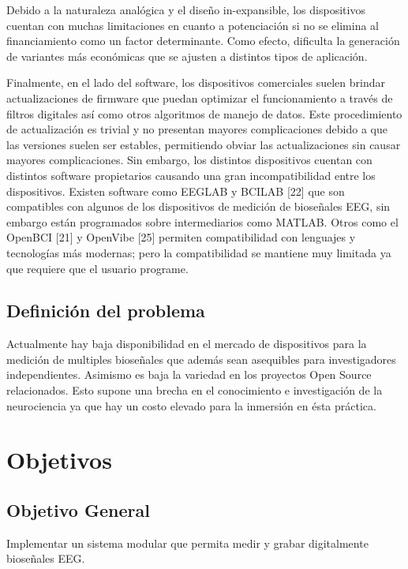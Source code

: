Debido a la naturaleza analógica y el diseño in-expansible, los dispositivos cuentan con muchas limitaciones en cuanto a potenciación si no se elimina al financiamiento como un factor determinante. Como efecto, dificulta la generación de variantes más económicas que se ajusten a distintos tipos de aplicación.

Finalmente, en el lado del software, los dispositivos comerciales suelen brindar actualizaciones de firmware que puedan optimizar el funcionamiento a través de filtros digitales así como otros algoritmos de manejo de datos. Este procedimiento de actualización es trivial y no presentan mayores complicaciones debido a que las versiones suelen ser estables, permitiendo obviar las actualizaciones sin causar mayores complicaciones. Sin embargo, los distintos dispositivos cuentan con distintos software propietarios causando una gran incompatibilidad entre los dispositivos. Existen software como EEGLAB y BCILAB [22] que son compatibles con algunos de los dispositivos de medición de bioseñales EEG, sin embargo están programados sobre intermediarios como MATLAB. Otros como el OpenBCI [21] y OpenVibe [25] permiten compatibilidad con lenguajes y tecnologías más modernas; pero la compatibilidad se mantiene muy limitada ya que requiere que el usuario programe.

\subsection{Definición del problema}
\label{sec:org88e0b95}
Actualmente hay baja disponibilidad en el mercado de dispositivos para la medición de multiples bioseñales que además sean asequibles para investigadores independientes. Asimismo es baja la variedad en los proyectos Open Source relacionados. Esto supone una brecha en el conocimiento e investigación de la neurociencia ya que hay un costo elevado para la inmersión en ésta práctica.

\section{Objetivos}
\label{sec:org3643799}
\subsection{Objetivo General}
\label{sec:orgce1e4b4}
Implementar un sistema modular que permita medir y grabar digitalmente bioseñales EEG.


